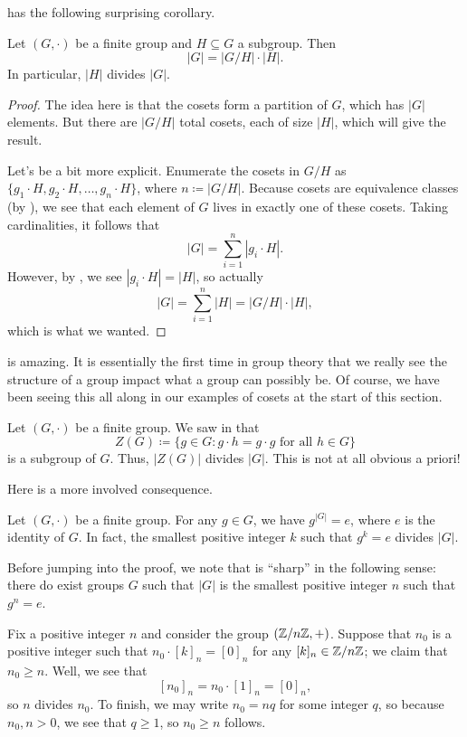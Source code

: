 \documentclass[../main.tex]{subfiles}
\begin{document}
 has the following surprising corollary.
\begin{corollary} \label{cor:ord-subgroup}
    Let $(G,\cdot)$ be a finite group and $H\subseteq G$ a subgroup. Then
    \[|G|=|G/H|\cdot|H|.\]
    In particular, $|H|$ divides $|G|$.
\end{corollary}
\begin{proof}
    The idea here is that the cosets form a partition of $G$, which has $|G|$ elements. But there are $|G/H|$ total cosets, each of size $|H|$, which will give the result.
    
    Let's be a bit more explicit. Enumerate the cosets in $G/H$ as $\{g_1\cdot H,g_2\cdot H,\ldots,g_n\cdot H\}$, where $n\coloneqq|G/H|$. Because cosets are equivalence classes (by ), we see that each element of $G$ lives in exactly one of these cosets. Taking cardinalities, it follows that
    \[|G|=\sum_{i=1}^n|g_i\cdot H|.\]
    However, by , we see $|g_i\cdot H|=|H|$, so actually
    \[|G|=\sum_{i=1}^n|H|=|G/H|\cdot |H|,\]
    which is what we wanted.
\end{proof}
 is amazing. It is essentially the first time in group theory that we really see the structure of a group impact what a group can possibly be. Of course, we have been seeing this all along in our examples of cosets at the start of this section.
\begin{example}
    Let $(G,\cdot)$ be a finite group. We saw in  that
    \[Z(G)\coloneqq\{g\in G:g\cdot h=g\cdot g\text{ for all }h\in G\}\]
    is a subgroup of $G$. Thus, $|Z(G)|$ divides $|G|$. This is not at all obvious a priori!
\end{example}
Here is a more involved consequence.
\begin{proposition} \label{prop:ord-of-g-divides-ord-of-g}
    Let $(G,\cdot)$ be a finite group. For any $g\in G$, we have $g^{\left|G\right|}=e$, where $e$ is the identity of $G$. In fact, the smallest positive integer $k$ such that $g^k=e$ divides $\left|G\right|$.
\end{proposition}
Before jumping into the proof, we note that  is ``sharp'' in the following sense: there do exist groups $G$ such that $\left|G\right|$ is the smallest positive integer $n$ such that $g^n=e$.
\begin{example}
    Fix a positive integer $n$ and consider the group $(\mathbb Z/n\mathbb Z,+)$. Suppose that $n_0$ is a positive integer such that $n_0\cdot[k]_n=[0]_n$ for any $[k]_n\in\mathbb Z/n\mathbb Z$; we claim that $n_0\ge n$. Well, we see that
    \[[n_0]_n=n_0\cdot[1]_n=[0]_n,\]
    so $n$ divides $n_0$. To finish, we may write $n_0=nq$ for some integer $q$, so because $n_0,n>0$, we see that $q\ge1$, so $n_0\ge n$ follows.
\end{example}
\end{document}
